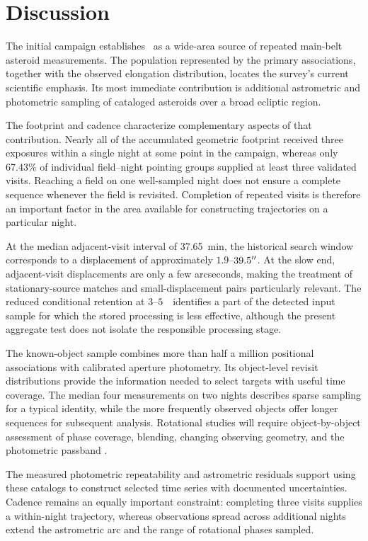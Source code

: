 \section{Discussion}
\label{sec:discussion}


The initial campaign establishes \SHARP\ as a
wide-area source of repeated main-belt asteroid
measurements. The population represented by the
primary associations, together with the observed
elongation distribution, locates the survey's
current scientific emphasis. Its most immediate
contribution is additional astrometric and
photometric sampling of cataloged asteroids
over a broad ecliptic region.

The footprint and cadence characterize
complementary aspects of that contribution.
Nearly all of the accumulated geometric
footprint received three exposures within a
single night at some point in the campaign,
whereas only 67.43\% of individual
field--night pointing groups supplied at
least three validated visits. Reaching a
field on one well-sampled night does not
ensure a complete sequence whenever the
field is revisited. Completion of repeated
visits is therefore an important factor in
the area available for constructing
trajectories on a particular night.

At the median adjacent-visit interval of
37.65~min, the historical search window
corresponds to a displacement of approximately
$1.9$--$39.5^{\prime\prime}$. At the slow end,
adjacent-visit displacements are only
a few arcseconds, making the treatment
of stationary-source matches and
small-displacement pairs particularly
relevant. The reduced conditional retention
at $3$--$5$~\rateunit\ identifies a part of
the detected input sample for which the
stored processing is less effective, although
the present aggregate test does not isolate
the responsible processing stage.


The known-object sample combines more than
half a million positional associations with
calibrated aperture photometry. Its
object-level revisit distributions provide
the information needed to select targets
with useful time coverage. The median
four measurements on two nights describes
sparse sampling for a typical identity,
while the more frequently observed objects
offer longer sequences for subsequent
analysis. Rotational studies will require
object-by-object assessment of phase
coverage, blending, changing observing
geometry, and the photometric passband
\citep{WarnerHarrisPravec2009}.

The measured photometric repeatability
and astrometric residuals support
using these catalogs to construct
selected time series with documented
uncertainties. Cadence remains an
equally important constraint: completing
three visits supplies a within-night
trajectory, whereas observations spread
across additional nights extend the
astrometric arc and the range of
rotational phases sampled.

